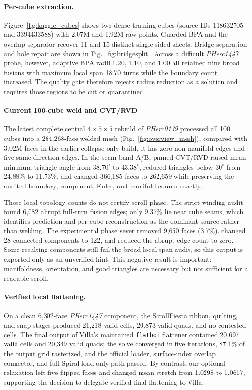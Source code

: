 \paragraph{Per-cube extraction.}
Figure~\ref{fig:kaggle_cubes} shows two dense training cubes (source IDs 118632705 and 3394433588) with 2.07M and 1.92M raw points. Guarded BPA and the overlap separator recover 11 and 15 distinct single-sided sheets. Bridge separation and hole repair are shown in Fig.~\ref{fig:bridgesplit}. Across a difficult {\em PHerc1447} probe, however, adaptive BPA radii 1.20, 1.10, and 1.00 all retained nine broad fusions with maximum local span 18.70 turns while the boundary count increased. The quality gate therefore rejects radius reduction as a solution and requires those regions to be cut or quarantined.

\paragraph{Current 100-cube weld and CVT/RVD}
The latest complete central $4\times5\times5$ rebuild of {\em PHerc0139} processed all 100 cubes into a 264,268-face welded mesh (Fig.~\ref{fig:overview_mesh}), compared with 3.02M faces in the earlier collapse-only build. It has zero non-manifold edges and five same-direction edges. In the seam-band A/B, pinned CVT/RVD raised mean minimum triangle angle from $38.70^\circ$ to $43.38^\circ$, reduced triangles below $30^\circ$ from 24.88\% to 11.73\%, and changed 366,185 faces to 262,659 while preserving the audited boundary, component, Euler, and manifold counts exactly.

Those local topology counts do not certify scroll phase. The strict winding audit found 6,082 abrupt full-turn fusion edges; only 9.37\% lie near cube seams, which identifies prediction and per-cube reconstruction as the dominant source rather than welding. The experimental phase sever removed 9,650 faces (3.7\%), changed 28 connected components to 122, and reduced the abrupt-edge count to zero. Some resulting components still fail the broad local-span audit, so this output is exported only as an unverified hint. This negative result is important: manifoldness, orientation, and good triangles are necessary but not sufficient for a readable scroll.

\paragraph{Verified local flattening.}
On a clean 6,302-face {\em PHerc1447} component, the ScrollFiesta ribbon, quilting, and snap stages produced 21,218 valid cells, 20,873 valid quads, and no contested cells. The final output of Villa's maintained \texttt{flatboi} flattener contained 20,697 valid cells and 20,349 valid quads; the solve converged in five iterations, 87.1\% of the output grid rasterized, and the official loader, surface-index overlap connector, and full Spiral load-only path passed. By contrast, our optional relaxation left five flipped faces and changed mean stretch from 1.0298 to 1.0617, supporting the decision to delegate verified final flattening to Villa.

